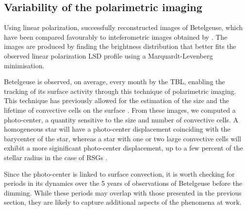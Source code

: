 \documentclass{aa}
\begin{document}

\subsection{Variability of the polarimetric imaging}

Using linear polarization, \cite{lopez_ariste_convective_2018} successfully reconstructed images of Betelgeuse, which have been compared favourably to inteferometric images obtained by \cite{montarges_close_2016}. The images are produced by finding the brightness distribution that better fits the observed linear 
polarization LSD profile using a Marquardt-Levenberg minimisation.

Betelgeuse is observed, on average, every month by the TBL, enabling the tracking of its surface activity through this technique of polarimetric imaging. This technique has previously allowed for the estimation of  the size and the
 lifetime of convective cells on the surface \citep{lopez_ariste_convective_2018}. From these images, we computed a photo-center, a quantity sensitive to the size and number of convective cells. 
A homogeneous star will have a photo-center displacement coinciding with the barycenter of the star, whereas a star with one or two large convective cells will exhibit a more siginificant photo-center displacement, up to a few percent of the stellar radius in the case of RSGs \citep{chiavassa_probing_2022}. 

Since the photo-center is linked to surface convection, it is worth checking for periods in its 
dynamics over the 5 years of observations of Betelgeuse before the dimming. While these periods may overlap with those presented in the previous section, they are likely to capture additional aspects of the phenomena at work.
\end{document}
